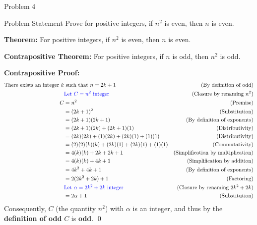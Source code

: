 \begin{problem}{Problem 4}
    \begin{statement}{Problem Statement}
        Prove for positive integers, if $n^{2}$ is even, then $n$ is even.
    \end{statement}

    \begin{Highlight}[Solution]
        \textbf{Theorem:} For positive integers, if $n^{2}$ is even, then $n$ is even. \vspace{1em}

        \textbf{Contrapositive Theorem:} For positive integers, if $n$ is odd, then $n^{2}$ is odd. \vspace*{1em}

        \textbf{Contrapositive Proof:} \newline
        \begin{align*}
            \text{There exists an integer } k & \text{ such that } n = 2k + 1 & \text{(By definition of odd)} \\
            & \textcolor{blue}{\text{Let } C = n^{2} \text{ integer}} & \text{(Closure by renaming $n^{2}$)} \\
            C & = n^{2} & \text{(Premise)} \\
            & = (2k + 1)^{2} & \text{(Substitution)} \\
            & = (2k + 1)(2k + 1) & \text{(By definition of exponents)} \\
            & = (2k + 1)(2k) + (2k + 1)(1) & \text{(Distributivity)} \\
            & = (2k)(2k) + (1)(2k) + (2k)(1) + (1)(1) & \text{(Distributivity)} \\
            & = (2)(2)(k)(k) + (2k)(1) + (2k)(1) + (1)(1) & \text{(Commutativity)} \\
            & = 4(k)(k) + 2k + 2k + 1 & \text{(Simplification by multiplication)} \\
            & = 4(k)(k) + 4k + 1 & \text{(Simplification by addition)} \\
            & = 4k^{2} + 4k + 1 & \text{(By definition of exponents)} \\
            & = 2(2k^{2} + 2k) + 1 & \text{(Factoring)} \\
            & \textcolor{blue}{\text{Let } \alpha = 2k^{2} + 2k \text{ integer}} & \text{(Closure by renaming $2k^{2} + 2k$)} \\
            & = 2\alpha + 1 & \text{(Substitution)} \\
        \end{align*}
        Consequently, $C$ (the quantity $n^{2}$) with $\alpha$ is an integer, and thus by the \textbf{definition of odd} $C$ is \textbf{odd}. \qed 


\end{Highlight}
\end{problem}

